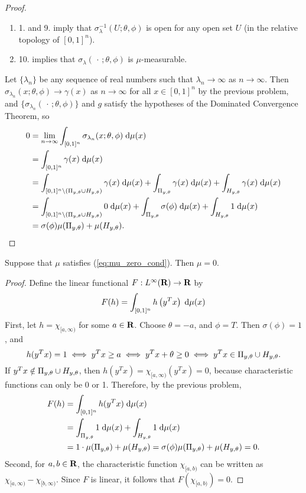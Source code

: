 \documentclass{homework}
\begin{document}
\begin{proof}
\begin{enumerate}
			\item 1. and 9. imply that $\sigma_\lambda^{-1}(U;\theta,\phi)$ is open for any open set $U$ (in the relative topology of $[0,1]^n$).
			\item 10. implies that $\sigma_\lambda(\,\cdot\,;\theta,\phi)$ is $\mu$-measurable.
		\end{enumerate}
		Let $\{\lambda_n\}$ be any sequence of real numbers such that $\lambda_n \to \infty$ as $n\to\infty$. Then $\sigma_{\lambda_n}(x;\theta,\phi) \to \gamma(x)$ as $n \to \infty$ for all $x \in [0,1]^n$ by the previous problem, and $\{\sigma_{\lambda_n}(\,\cdot\,;\theta,\phi)\}$ and $g$ satisfy the hypotheses of the Dominated Convergence Theorem, so
		\begin{align}
			0&=\lim_{n\to\infty}\int_{[0,1]^n}\sigma_{\lambda_n}(x;\theta,\phi)\;\text{d}\mu(x) \\
			&= \int_{[0,1]^n} \gamma(x)\;\text{d}\mu(x) \\
			&= \int_{[0,1]^n \setminus (\Pi_{y,\theta} \cup H_{y,\theta})} \gamma(x)\;\text{d}\mu(x) + \int_{\Pi_{y,\theta}}\gamma(x)\;\text{d}\mu(x) + \int_{H_{y,\theta}}\gamma(x)\;\text{d}\mu(x)  \\
			&= \int_{[0,1]^n\setminus(\Pi_{y,\theta}\cup H_{y,\theta})} 0\;\text{d}\mu(x) + \int_{\Pi_{y,\theta}}\sigma(\phi)\;\text{d}\mu(x) + \int_{H_{y,\theta}}1\;\text{d}\mu(x) \\
			&= \sigma(\phi)\mu(\Pi_{y,\theta}) + \mu(H_{y,\theta}).
		\end{align}
	\end{proof}
	
	\question
	Suppose that $\mu$ satisfies (\ref{eq:mu_zero_cond}). Then $\mu = 0$. 
	\begin{proof}
		Define the linear functional $F: L^\infty(\textbf{R}) \to \textbf{R}$ by
		\begin{equation}
			F(h) = \int_{[0,1]^n}h\left(y^Tx\right)\;\text{d}\mu(x)
		\end{equation}
		First, let $h = \chi_{[a,\infty)}$ for some $a \in \textbf{R}$. Choose $\theta = -a$, and $\phi = T$. Then $\sigma(\phi) = 1$, and
		\begin{equation}
			h(y^Tx) = 1 \iff y^Tx \ge a \iff y^Tx + \theta  \ge 0 \iff y^Tx \in \Pi_{y,\theta} \cup H_{y,\theta}.
		\end{equation}
		If $y^Tx \notin \Pi_{y,\theta} \cup H_{y,\theta}$, then $h(y^Tx) = \chi_{[a,\infty)}(y^Tx) = 0$, because characteristic functions can only be 0 or 1. Therefore, by the previous problem,
		\begin{align}
			F(h) &= \int_{[0,1]^n}h(y^Tx)\;\text{d}\mu(x) \\
			&= \int_{\Pi_{y,\theta}}1\;\text{d} \mu(x) + \int_{H_{y,\theta}} 1\;\text{d}\mu(x) \\
			&= 1\cdot\mu(\Pi_{y,\theta}) + \mu(H_{y,\theta}) = \sigma(\phi)\mu(\Pi_{y,\theta}) + \mu(H_{y,\theta}) = 0.
		\end{align}
		Second, for $a,b\in \textbf{R}$, the characteristic function $\chi_{[a,b)}$ can be written as $\chi_{[a,\infty)} - \chi_{[b,\infty)}$. Since $F$ is linear, it follows that $F\left(\chi_{[a,b)}\right) = 0$.
	\end{proof}
	
\end{document}
